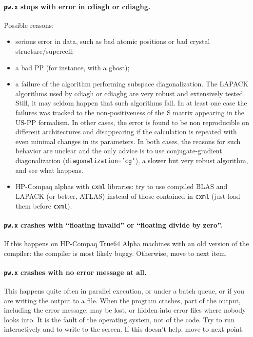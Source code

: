 \documentclass[12pt,a4paper]{article}
\begin{document}
\paragraph{\texttt{pw.x} stops with error in cdiagh or cdiaghg.}

Possible reasons:
\begin{itemize}
  \item
    serious error in data, such as bad atomic positions or bad crystal
    structure/supercell;
  \item
    a bad PP (for instance, with a ghost);
  \item
    a failure of the algorithm performing subspace diagonalization. 
    The LAPACK algorithms used by cdiagh or cdiaghg are very robust 
    and extensively tested. Still, it may seldom happen that such
    algorithms fail. In at least one case the failures was tracked
    to the non-positiveness of the S matrix appearing in the US-PP
    formalism. In other cases, the error is found to be non reproducible
    on different architectures and disappearing if the calculation
    is repeated with even minimal changes in its parameters. 
    In both cases, the reasons for such behavior are unclear and
    the only advice is to use conjugate-gradient diagonalization
    (\texttt{diagonalization='cg'}), a slower but very robust
    algorithm, and see what happens.
  \item
    HP-Compaq alphas with \texttt{cxml} libraries: try to use compiled
    BLAS and LAPACK (or better, ATLAS) instead of those contained in
    \texttt{cxml} (just load them before \texttt{cxml}).
\end{itemize}

\paragraph{\texttt{pw.x} crashes with ``floating invalid'' or ``floating divide by zero''.}

If this happens on HP-Compaq True64 Alpha machines with an old
version of the compiler: the compiler is most likely buggy.
Otherwise, move to next item.

\paragraph{\texttt{pw.x} crashes with no error message at all.}

This happens quite often in parallel execution, or under a batch
queue, or if you are writing the output to a file.
When the program crashes, part of the output, including the error
message, may be lost, or hidden into error files where nobody looks
into.
It is the fault of the operating system, not of the code.
Try to run interactively and to write to the screen.
If this doesn't help, move to next point.
\end{document}

